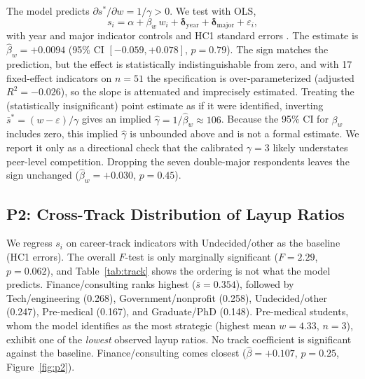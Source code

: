 \documentclass[12pt]{article}
\begin{document}
The model predicts $\partial s^\ast / \partial w = 1/\gamma > 0$. We
test with OLS,
\begin{equation}
  s_i = \alpha + \beta_w\, w_i + \bm{\delta}_{\text{year}} +
        \bm{\delta}_{\text{major}} + \varepsilon_i,
\end{equation}
with year and major indicator controls and HC1 standard errors
\parencite{long2000using}. The estimate is $\hat\beta_w = +0.0094$
(95\% CI $[-0.059, +0.078]$, $p = 0.79$). The sign matches the
prediction, but the effect is statistically indistinguishable from
zero, and with 17 fixed-effect indicators on $n = 51$ the
specification is over-parameterized (adjusted $R^2 = -0.026$), so the
slope is attenuated and imprecisely estimated. Treating the
(statistically insignificant) point estimate as if it were identified,
inverting $\bar s^\ast = (w - \varepsilon)/\gamma$ gives an implied
$\hat\gamma = 1/\hat\beta_w \approx 106$. Because the 95\% CI for
$\beta_w$ includes zero, this implied $\hat\gamma$ is unbounded above
and is not a formal estimate. We report it only as a directional check
that the calibrated $\gamma = 3$ likely understates peer-level
competition. Dropping the seven double-major
respondents leaves the sign unchanged
($\hat\beta_w = +0.030$, $p = 0.45$).

\subsection{P2: Cross-Track Distribution of Layup Ratios}

We regress $s_i$ on career-track indicators with Undecided/other as
the baseline (HC1 errors). The overall $F$-test is only marginally
significant ($F = 2.29$, $p = 0.062$), and Table~\ref{tab:track} shows the
ordering is not what the model predicts. Finance/consulting ranks
highest ($\bar s = 0.354$), followed by Tech/engineering (0.268),
Government/nonprofit (0.258), Undecided/other (0.247), Pre-medical
(0.167), and Graduate/PhD (0.148). Pre-medical students, whom the
model identifies as the most strategic (highest mean $w = 4.33$,
$n = 3$), exhibit one of the \emph{lowest} observed layup ratios. No
track coefficient is significant against the baseline.
Finance/consulting comes closest
($\hat\beta = +0.107$, $p = 0.25$, Figure~\ref{fig:p2}).
\end{document}
